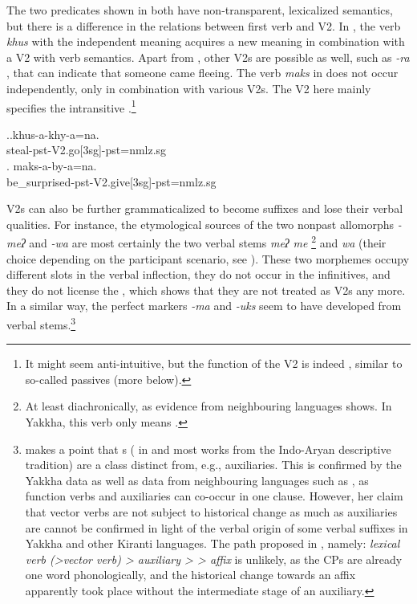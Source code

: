 The two predicates shown in \Next both have non-transparent, lexicalized semantics, but there is a difference in the relations between first verb and V2. In \Next[a], the verb \emph{khus} with the independent meaning  acquires a new meaning in combination with a V2 with  verb semantics. Apart from , other V2s are possible as well, such as \emph{-ra} , that can indicate that someone came fleeing. The verb \emph{maks} in \Next[b] does not occur independently, only in combination with various V2s. The  V2 here mainly specifies the intransitive .\footnote{It might seem anti-intuitive, but the function of the V2  is indeed , similar to so-called  passives (more below).} 

\ex.\ag.khus-a-khy-a=na.\\
steal{\sc -pst-V2.go[3sg]-pst=nmlz.sg}\\
\bg. maks-a-by-a=na.\\
be\_surprised{\sc -pst-V2.give[3sg]-pst=nmlz.sg}\\


V2s can also be further grammaticalized to become suffixes and lose their verbal qualities. For instance, the etymological sources of the two nonpast allomorphs \emph{-meʔ} and \emph{-wa} are most certainly the two verbal stems \emph{meʔ \ti me} \footnote{At least diachronically, as evidence from neighbouring languages shows. In Yakkha, this verb only means .} and \emph{wa}  (their choice depending on the participant scenario, see ). These two morphemes occupy different slots in the verbal inflection,  they do not occur in the infinitives, and they do not license the , which shows that they are not treated as V2s any more. In a similar way, the perfect  markers \emph{-ma} and \emph{-uks} seem to have developed from verbal stems.\footnote{\citet[66]{Butt2010_Light} makes a point that s ( in \citet{Butt2010_Light} and most works from the  Indo-Aryan descriptive tradition) are a class distinct from, e.g., auxiliaries. This is confirmed by the Yakkha data as well as data from neighbouring languages such as  \citep{Bickeletal2007Free}, as function verbs and auxiliaries can co-occur in one clause. However, her claim that vector verbs are not subject to historical change as much as auxiliaries are cannot be confirmed in light of the verbal origin of some verbal suffixes in Yakkha and other Kiranti languages. The  path proposed in \citet[108]{Hopperetal1993Grammaticalization}, namely: \emph{lexical verb (>vector verb) > auxiliary >  > affix} is unlikely, as the CPs are already one word phonologically, and the historical change towards an affix apparently took place without the intermediate stage of an auxiliary.} 



